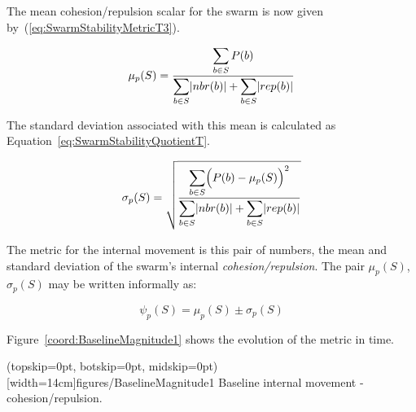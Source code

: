 \documentclass{ieeeaccess}
\begin{document}
The mean cohesion/repulsion scalar for the swarm is now given
by~(\ref{eq:SwarmStabilityMetricT3}).  

\begin{equation}
\label{eq:SwarmStabilityMetricT3}
\mu_p(S) = \frac{\mathlarger{\sum_{b \in S} P(b)}}{\mathlarger{\sum_{b \in S}}|nbr(b)| + \mathlarger{\sum_{b \in S}}|rep(b)|}
\end{equation}


The standard deviation associated with this mean is calculated as
Equation~\ref{eq:SwarmStabilityQuotientT}.


\begin{equation}
\label{eq:SwarmStabilityQuotientT}
\sigma_p(S) = \sqrt{\frac{\mathlarger{\sum_{b \in S}}\Big(P(b)-\mu_p(S)\Big)^2}{\mathlarger{\sum_{b \in S}}|nbr(b)| + \mathlarger{\sum_{b \in S}}|rep(b)|}}
\end{equation}

The metric for the internal movement is this pair of numbers, the mean and
standard deviation of the swarm's internal \textit{cohesion/repulsion}. The
pair $\mu_p(S)$, $\sigma_p(S)$ may be written informally as: 

\begin{equation}
\label{eq:SwarmPotentialMagnitude}
\psi_p(S) = \mu_p(S)\pm \sigma_p(S)
\end{equation}

Figure~\ref{coord:BaselineMagnitude1} shows the evolution of the metric in time.

\Figure[t!](topskip=0pt, botskip=0pt, midskip=0pt)[width=14cm]{figures/BaselineMagnitude1}
{Baseline internal movement - cohesion/repulsion.\label{coord:BaselineMagnitude1}}

\end{document}
